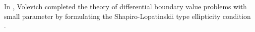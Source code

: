 \documentclass[10pt,a4paper]{article}
\begin{document}
%
%
In \cite{Vole06}, Volevich completed the theory of differential boundary value problems with small parameter by formulating the Shapiro-Lopatinskii type ellipticity condition%
.
\end{document}
